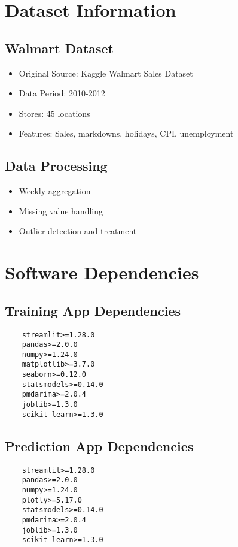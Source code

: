 \section{Dataset Information}

\subsection{Walmart Dataset}
\begin{itemize}
	\item Original Source: Kaggle Walmart Sales Dataset
	\item Data Period: 2010-2012
	\item Stores: 45 locations
	\item Features: Sales, markdowns, holidays, CPI, unemployment
\end{itemize}

\subsection{Data Processing}
\begin{itemize}
	\item Weekly aggregation
	\item Missing value handling
	\item Outlier detection and treatment
\end{itemize}

\section{Software Dependencies}

\subsection{Training App Dependencies}
\begin{verbatim}
	streamlit>=1.28.0
	pandas>=2.0.0
	numpy>=1.24.0
	matplotlib>=3.7.0
	seaborn>=0.12.0
	statsmodels>=0.14.0
	pmdarima>=2.0.4
	joblib>=1.3.0
	scikit-learn>=1.3.0
\end{verbatim}

\subsection{Prediction App Dependencies}
\begin{verbatim}
	streamlit>=1.28.0
	pandas>=2.0.0
	numpy>=1.24.0
	plotly>=5.17.0
	statsmodels>=0.14.0
	pmdarima>=2.0.4
	joblib>=1.3.0
	scikit-learn>=1.3.0
\end{verbatim}

